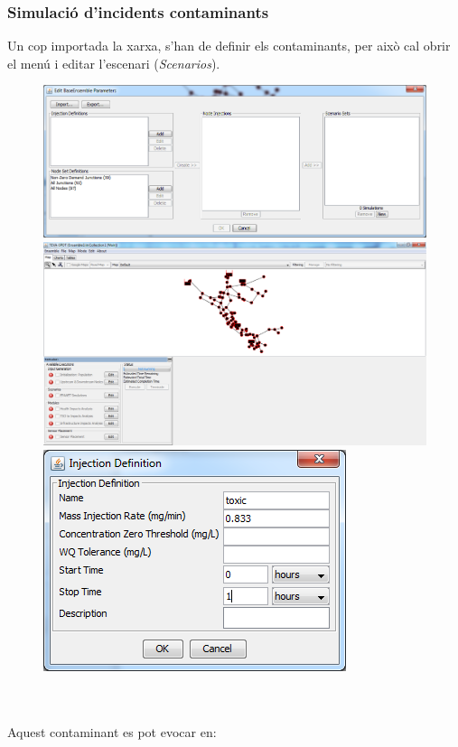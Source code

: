 \documentclass[12pt]{article}
\begin{document}
\subsubsection{Simulació d'incidents contaminants\label{epa_contaminants}}
Un cop importada la xarxa, s'han de definir els contaminants, per això cal obrir el menú  i editar l'escenari (\textit{Scenarios}).
\begin{figure}[h!]
	\includegraphics[scale=.4]{imatges/teva-spot/3.png}
	\includegraphics[scale=.4]{imatges/teva-spot/4.png}
	\includegraphics[scale=.4]{imatges/teva-spot/5.png}
\end{figure}
\\\\Aquest contaminant es pot evocar en:
\end{document}
